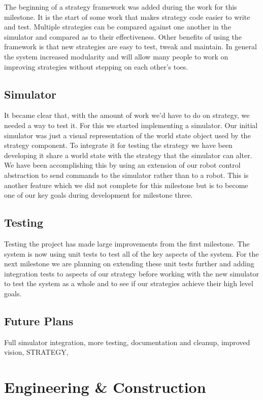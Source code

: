 \documentclass[12pt, a4paper, titlepage]{article}
\begin{document}
The beginning of a strategy framework was added during the work for this
milestone. It is the start of some work that makes strategy code easier to
write and test. Multiple strategies can be compared against one another in
the simulator and compared as to their effectiveness. Other benefits of using
the framework is that new strategies are easy to test, tweak and maintain. In
general the system increased modularity and will allow many people to work on
improving strategies without stepping on each other’s toes.

\subsection{Simulator}

It became clear that, with the amount of work we’d have to do on strategy,
we needed a way to test it. For this we started implementing a simulator. Our
initial simulator was just a visual representation of the world state object
used by the strategy component. To integrate it for testing the strategy we have
been developing it share a world state with the strategy that the simulator
can alter. We have been accomplishing this by using an extension of our robot
control abstraction to send commands to the simulator rather than to a robot.
This is another feature which we did not complete for this milestone but is to
become one of our key goals during development for milestone three.

\subsection{Testing}

Testing the project has made large improvements from the first milestone. The
system is now using unit tests to test all of the key aspects of the system. For
the next milestone we are planning on extending these unit tests further and
adding integration tests to aspects of our strategy before working with the new
simulator to test the system as a whole and to see if our strategies achieve
their high level goals.

\subsection{Future Plans}

Full simulator integration, more testing, documentation and cleanup, improved
vision, STRATEGY,

\section{Engineering \& Construction}
\end{document}
